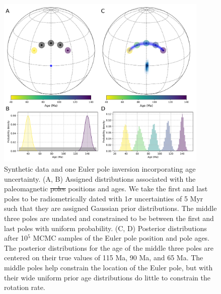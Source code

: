 \documentclass[11pt,letterpaper]{article}
\providecommand{\DIFaddtex}[1]{{\protect\color{blue}\uwave{#1}}} %
\providecommand{\DIFdeltex}[1]{{\protect\color{red}\sout{#1}}}                      %
\providecommand{\DIFaddFL}[1]{\DIFadd{#1}} %
\providecommand{\DIFdelFL}[1]{\DIFdel{#1}} %
\providecommand{\DIFaddbeginFL}{} %
\providecommand{\DIFaddendFL}{} %
\providecommand{\DIFdelbeginFL}{} %
\providecommand{\DIFdelendFL}{} %
\providecommand{\DIFadd}[1]{\texorpdfstring{\DIFaddtex{#1}}{#1}} %
\providecommand{\DIFdel}[1]{\texorpdfstring{\DIFdeltex{#1}}{}} %
\newcommand{\DIFscaledelfig}{0.5}
\newlength{\DIFdelgraphicswidth} %
\newlength{\DIFdelgraphicsheight} %
\newcommand{\DIFaddincludegraphics}[2][]{{\color{blue}\fbox{\DIFOincludegraphics[#1]{#2}}}} %
\newcommand{\DIFdelincludegraphics}[2][]{%
\sbox{\DIFdelgraphicsbox}{\DIFOincludegraphics[#1]{#2}}%
\settoboxwidth{\DIFdelgraphicswidth}{\DIFdelgraphicsbox} %
\settoboxtotalheight{\DIFdelgraphicsheight}{\DIFdelgraphicsbox} %
\scalebox{\DIFscaledelfig}{%
\parbox[b]{\DIFdelgraphicswidth}{\usebox{\DIFdelgraphicsbox}\\[-\baselineskip] \rule{\DIFdelgraphicswidth}{0em}}\llap{\resizebox{\DIFdelgraphicswidth}{\DIFdelgraphicsheight}{%
\setlength{\unitlength}{\DIFdelgraphicswidth}%
\begin{picture}(1,1)%
\thicklines\linethickness{2pt} %
{\color[rgb]{1,0,0}\put(0,0){\framebox(1,1){}}}%
{\color[rgb]{1,0,0}\put(0,0){\line( 1,1){1}}}%
{\color[rgb]{1,0,0}\put(0,1){\line(1,-1){1}}}%
\end{picture}%
}\hspace*{3pt}}} %
} %
\DeclareRobustCommand{\DIFaddbeginFL}{\DIFOaddbeginFL \let\includegraphics\DIFaddincludegraphics} %
\DeclareRobustCommand{\DIFaddendFL}{\DIFOaddendFL \let\includegraphics\DIFOincludegraphics} %
\DeclareRobustCommand{\DIFdelbeginFL}{\DIFOdelbeginFL \let\includegraphics\DIFdelincludegraphics} %
\DeclareRobustCommand{\DIFdelendFL}{\DIFOaddendFL \let\includegraphics\DIFOincludegraphics} %
\begin{document}
\begin{figure}
\centering
\includegraphics[width=0.9\textwidth]{fig_inversion_with_age_uncertainties.png}
\caption{Synthetic data and one Euler pole inversion incorporating age uncertainty. (A, B) Assigned distributions associated with the paleomagnetic \DIFdelbeginFL \DIFdelFL{poles }\DIFdelendFL \DIFaddbeginFL \DIFaddFL{pole }\DIFaddendFL positions and ages. We take the first and last poles to be radiometrically dated with 1$\sigma$ uncertainties of 5 Myr such that they are assigned Gaussian prior distributions. The middle three poles are undated and constrained to be between the first and last poles with uniform probability. (C, D) Posterior distributions after 10\DIFdelbeginFL \DIFdelFL{$^5$ }\DIFdelendFL \DIFaddbeginFL \DIFaddFL{$^4$ }\DIFaddendFL MCMC samples of the Euler pole position and pole ages. The posterior distributions for the age of the middle three poles are centered on their true values of 115 Ma, 90 Ma, and 65 Ma. The middle poles help constrain the location of the Euler pole, but with their wide uniform prior age distributions do little to constrain the rotation rate.}
\label{fig:age_uncertainty_samples}
\end{figure}
\end{document}
